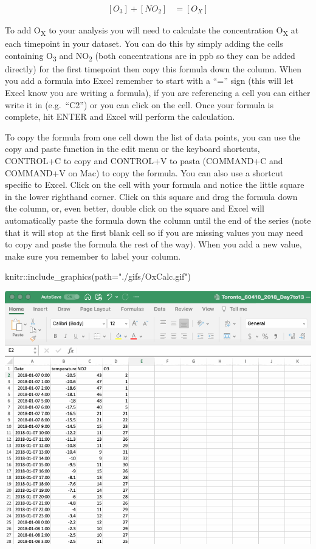 \documentclass[
]{book}
\newenvironment{Shaded}{\begin{snugshade}}{\end{snugshade}}
\newcommand{\AttributeTok}[1]{\textcolor[rgb]{0.77,0.63,0.00}{#1}}
\newcommand{\FunctionTok}[1]{\textcolor[rgb]{0.00,0.00,0.00}{#1}}
\newcommand{\NormalTok}[1]{#1}
\newcommand{\SpecialCharTok}[1]{\textcolor[rgb]{0.00,0.00,0.00}{#1}}
\newcommand{\StringTok}[1]{\textcolor[rgb]{0.31,0.60,0.02}{#1}}
\begin{document}
\[
\begin{align}
    [O_3] + [NO_2] &= [O_X] \label{eq4}\tag{4} 
\end{align}
\]

To add O\textsubscript{X} to your analysis you will need to calculate the concentration O\textsubscript{X} at each timepoint in your dataset. You can do this by simply adding the cells containing O\textsubscript{3} and NO\textsubscript{2} (both concentrations are in ppb so they can be added directly) for the first timepoint then copy this formula down the column. When you add a formula into Excel remember to start with a ``='' sign (this will let Excel know you are writing a formula), if you are referencing a cell you can either write it in (e.g.~``C2'') or you can click on the cell. Once your formula is complete, hit ENTER and Excel will perform the calculation.

To copy the formula from one cell down the list of data points, you can use the copy and paste function in the edit menu or the keyboard shortcuts, CONTROL+C to copy and CONTROL+V to pasta (COMMAND+C and COMMAND+V on Mac) to copy the formula. You can also use a shortcut specific to Excel. Click on the cell with your formula and notice the little square in the lower righthand corner. Click on this square and drag the formula down the column, or, even better, double click on the square and Excel will automatically paste the formula down the column until the end of the series (note that it will stop at the first blank cell so if you are missing values you may need to copy and paste the formula the rest of the way). When you add a new value, make sure you remember to label your column.

\begin{Shaded}
\begin{Highlighting}[]
\NormalTok{knitr}\SpecialCharTok{::}\FunctionTok{include\_graphics}\NormalTok{(}\AttributeTok{path=}\StringTok{"./gifs/OxCalc.gif"}\NormalTok{)}
\end{Highlighting}
\end{Shaded}

\includegraphics{./gifs/OxCalc.gif}
\end{document}
